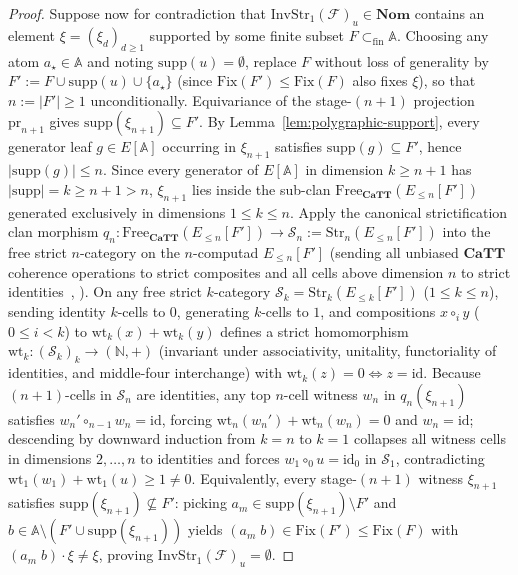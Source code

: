 \documentclass[10pt,twoside,openright]{book}
\theoremstyle{crmplain}
\theoremstyle{crmdef}
\theoremstyle{crmremark}
\begin{document}
\begin{proof}
Suppose now for contradiction that $\mathrm{InvStr}_1(\mathcal{F})_u \in \mathbf{Nom}$ contains an element $\xi = (\xi_d)_{d \ge 1}$ supported by some finite subset $F \subset_{\mathrm{fin}} \mathbb{A}$. Choosing any atom $a_\star \in \mathbb{A}$ and noting $\mathrm{supp}(u) = \emptyset$, replace $F$ without loss of generality by $F' := F \cup \mathrm{supp}(u) \cup \{a_\star\}$ (since $\mathrm{Fix}(F') \le \mathrm{Fix}(F)$ also fixes $\xi$), so that $n := |F'| \ge 1$ unconditionally. Equivariance of the stage-$(n+1)$ projection $\mathrm{pr}_{n+1}$ gives $\mathrm{supp}(\xi_{n+1}) \subseteq F'$. By Lemma~\ref{lem:polygraphic-support}, every generator leaf $g \in E[\mathbb{A}]$ occurring in $\xi_{n+1}$ satisfies $\mathrm{supp}(g) \subseteq F'$, hence $|\mathrm{supp}(g)| \le n$. Since every generator of $E[\mathbb{A}]$ in dimension $k \ge n + 1$ has $|\mathrm{supp}| = k \ge n + 1 > n$, $\xi_{n+1}$ lies inside the sub-clan $\mathrm{Free}_{\mathbf{CaTT}}(E_{\le n}[F'])$ generated exclusively in dimensions $1 \le k \le n$. Apply the canonical strictification clan morphism $q_n : \mathrm{Free}_{\mathbf{CaTT}}(E_{\le n}[F']) \to \mathcal{S}_n := \mathrm{Str}_n(E_{\le n}[F'])$ into the free strict $n$-category on the $n$-computad $E_{\le n}[F']$ (sending all unbiased $\mathbf{CaTT}$ coherence operations to strict composites and all cells above dimension $n$ to strict identities~\cite[\S 3]{FinsterMimram17}, \cite{BCM26}). On any free strict $k$-category $\mathcal{S}_k = \mathrm{Str}_k(E_{\le k}[F'])$ ($1 \le k \le n$), sending identity $k$-cells to $0$, generating $k$-cells to $1$, and compositions $x \circ_i y$ ($0 \le i < k$) to $\mathrm{wt}_k(x) + \mathrm{wt}_k(y)$ defines a strict homomorphism $\mathrm{wt}_k : (\mathcal{S}_k)_k \to (\mathbb{N}, +)$ (invariant under associativity, unitality, functoriality of identities, and middle-four interchange) with $\mathrm{wt}_k(z) = 0 \iff z = \mathrm{id}$. Because $(n+1)$-cells in $\mathcal{S}_n$ are identities, any top $n$-cell witness $w_n$ in $q_n(\xi_{n+1})$ satisfies $w_n' \circ_{n-1} w_n = \mathrm{id}$, forcing $\mathrm{wt}_n(w_n') + \mathrm{wt}_n(w_n) = 0$ and $w_n = \mathrm{id}$; descending by downward induction from $k = n$ to $k = 1$ collapses all witness cells in dimensions $2, \dots, n$ to identities and forces $w_1 \circ_0 u = \mathrm{id}_0$ in $\mathcal{S}_1$, contradicting $\mathrm{wt}_1(w_1) + \mathrm{wt}_1(u) \ge 1 \neq 0$. Equivalently, every stage-$(n+1)$ witness $\xi_{n+1}$ satisfies $\mathrm{supp}(\xi_{n+1}) \not\subseteq F'$: picking $a_m \in \mathrm{supp}(\xi_{n+1}) \setminus F'$ and $b \in \mathbb{A} \setminus (F' \cup \mathrm{supp}(\xi_{n+1}))$ yields $(a_m \; b) \in \mathrm{Fix}(F') \le \mathrm{Fix}(F)$ with $(a_m \; b) \cdot \xi \neq \xi$, proving $\mathrm{InvStr}_1(\mathcal{F})_u = \emptyset$.
\end{proof}
\end{document}
